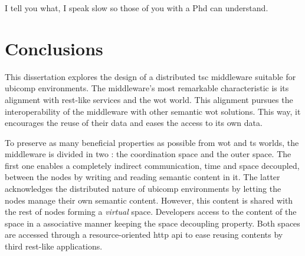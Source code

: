 

\begin{savequote}[50mm]
I tell you what, I speak slow so those of you with a Phd can understand.
\end{savequote}


\chapter{Conclusions}
\label{cha:conclusions}
\newcommand{\pathchapseven}{7_conclusion}


\ifpdf
    \graphicspath{{\pathchapseven/figures/PNG/}{\pathchapseven/figures/PDF/}{\pathchapseven/figures/}}
\else
    \graphicspath{{\pathchapseven/figures/EPS/}{\pathchapseven/figures/}}
\fi




This dissertation explores the design of a distributed \ac{tsc} middleware suitable for \ac{ubicomp} environments.
The middleware's most remarkable characteristic is its alignment with \ac{rest}-like services and the \ac{wot} world.
This alignment pursues the interoperability of the middleware with other semantic \ac{wot} solutions.
This way, it encourages the reuse of their data and eases the access to its own data.


To preserve as many beneficial properties as possible from \ac{wot} and \ac{ts} worlds, the middleware is divided in two \Spaces{}: the coordination space and the outer space. %
The first one enables a completely indirect communication, time and space decoupled, between the nodes by writing and reading semantic content in it.
The latter acknowledges the distributed nature of \ac{ubicomp} environments by letting the nodes manage their own semantic content.
However, this content is shared with the rest of nodes forming a \emph{virtual} space.
Developers access to the content of the space in a associative manner keeping the space decoupling property.
Both spaces are accessed through a resource-oriented \ac{http} \ac{api} to ease reusing contents by third \ac{rest}-like applications. %


